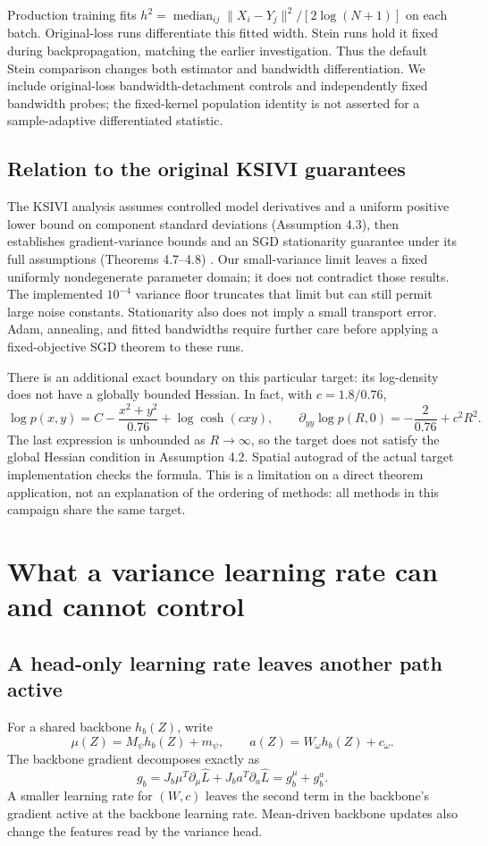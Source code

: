 \documentclass[11pt,a4paper]{article}
\begin{document}
Production training fits
$h^2=\operatorname{median}_{ij}\|X_i-Y_j\|^2/[2\log(N+1)]$ on each batch.
Original-loss runs differentiate this fitted width. Stein runs hold it fixed
during backpropagation, matching the earlier investigation. Thus the default
Stein comparison changes both estimator and bandwidth differentiation. We
include original-loss bandwidth-detachment controls and independently fixed
bandwidth probes; the fixed-kernel population identity is not asserted for a
sample-adaptive differentiated statistic.

\subsection{Relation to the original KSIVI guarantees}
The KSIVI analysis assumes controlled model derivatives and a uniform positive
lower bound on component standard deviations (Assumption 4.3), then establishes
gradient-variance bounds and an SGD stationarity guarantee under its full
assumptions (Theorems 4.7--4.8) \cite{ksivi}. Our small-variance limit leaves a
fixed uniformly nondegenerate parameter domain; it does not contradict those
results. The implemented $10^{-4}$ variance floor truncates that limit but can
still permit large noise constants. Stationarity also does not imply a small
transport error. Adam, annealing, and fitted bandwidths require further care
before applying a fixed-objective SGD theorem to these runs.

There is an additional exact boundary on this particular target: its log-density
does not have a globally bounded Hessian. In fact, with $c=1.8/0.76$,
\[
 \log p(x,y)=C-\frac{x^2+y^2}{0.76}+\log\cosh(cxy),\qquad
 \partial_{yy}\log p(R,0)=-\frac2{0.76}+c^2R^2.
\]
The last expression is unbounded as $R\to\infty$, so the target does not satisfy
the global Hessian condition in Assumption 4.2. Spatial autograd of the actual
target implementation checks the formula. This is a limitation on a direct
theorem application, not an explanation of the ordering of methods: all
methods in this campaign share the same target.

\section{What a variance learning rate can and cannot control}
\subsection{A head-only learning rate leaves another path active}
For a shared backbone $h_b(Z)$, write
\[
 \mu(Z)=M_\psi h_b(Z)+m_\psi,\qquad
 a(Z)=W_\omega h_b(Z)+c_\omega.
\]
The backbone gradient decomposes exactly as
\begin{equation}
 g_b=J_b\mu^T\partial_\mu\widehat L+J_b a^T\partial_a\widehat L
       =g_b^{\mu}+g_b^a.
 \label{eq:paths}
\end{equation}
A smaller learning rate for $(W,c)$ leaves the second term in the backbone's
gradient active at the backbone learning rate. Mean-driven backbone updates
also change the features read by the variance head.
\end{document}
